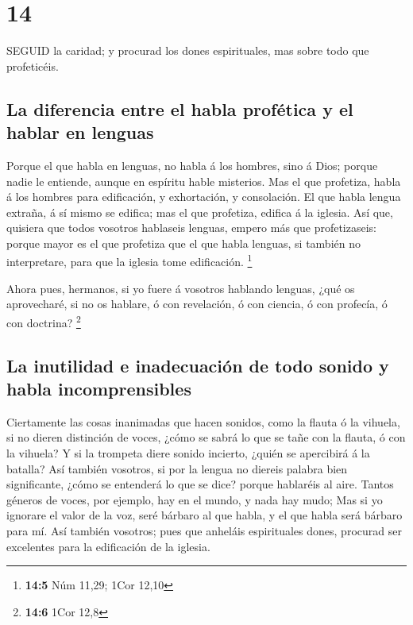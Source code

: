 \hypertarget{section-13}{%
\section{14}\label{section-13}}

 SEGUID la caridad; y procurad los dones espirituales, mas
sobre todo que profeticéis.

\hypertarget{la-diferencia-entre-el-habla-profuxe9tica-y-el-hablar-en-lenguas}{%
\subsection{La diferencia entre el habla profética y el hablar en
lenguas}\label{la-diferencia-entre-el-habla-profuxe9tica-y-el-hablar-en-lenguas}}

 Porque el que habla en lenguas, no habla á los hombres,
sino á Dios; porque nadie le entiende, aunque en espíritu hable
misterios.  Mas el que profetiza, habla á los hombres para
edificación, y exhortación, y consolación.  El que habla
lengua extraña, á sí mismo se edifica; mas el que profetiza, edifica á
la iglesia.  Así que, quisiera que todos vosotros hablaseis
lenguas, empero más que profetizaseis: porque mayor es el que profetiza
que el que habla lenguas, si también no interpretare, para que la
iglesia tome edificación. \footnote{\textbf{14:5} Núm 11,29; 1Cor 12,10}

 Ahora pues, hermanos, si yo fuere á vosotros hablando
lenguas, ¿qué os aprovecharé, si no os hablare, ó con revelación, ó con
ciencia, ó con profecía, ó con doctrina? \footnote{\textbf{14:6} 1Cor
  12,8}

\hypertarget{la-inutilidad-e-inadecuaciuxf3n-de-todo-sonido-y-habla-incomprensibles}{%
\subsection{La inutilidad e inadecuación de todo sonido y habla
incomprensibles}\label{la-inutilidad-e-inadecuaciuxf3n-de-todo-sonido-y-habla-incomprensibles}}

 Ciertamente las cosas inanimadas que hacen sonidos, como la
flauta ó la vihuela, si no dieren distinción de voces, ¿cómo se sabrá lo
que se tañe con la flauta, ó con la vihuela?  Y si la
trompeta diere sonido incierto, ¿quién se apercibirá á la batalla?
 Así también vosotros, si por la lengua no diereis palabra
bien significante, ¿cómo se entenderá lo que se dice? porque hablaréis
al aire.  Tantos géneros de voces, por ejemplo, hay en el
mundo, y nada hay mudo;  Mas si yo ignorare el valor de la
voz, seré bárbaro al que habla, y el que habla será bárbaro para mí.
 Así también vosotros; pues que anheláis espirituales
dones, procurad ser excelentes para la edificación de la iglesia.

